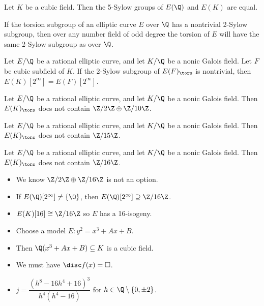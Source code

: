 \begin{frame}[plain]
\begin{prop}[Najman]
Let $K$ be a cubic field. Then the 5-Sylow groups of $E(\Q)$ and $E(K)$ are equal. 
\end{prop} \pause

\begin{prop}[Najman]
If the torsion subgroup of an elliptic curve $E$ over $\Q$ has a nontrivial 2-Sylow subgroup, then over any number field of odd degree the torsion of $E$ will have the same 2-Sylow subgroup as over $\Q$.
\end{prop} \pause

\begin{prop}
Let $E/\Q$ be a rational elliptic curve, and let $K/\Q$ be a nonic Galois field. Let $F$ be cubic subfield of $K$. If the 2-Sylow subgroup of $E(F)_\tors$ is nontrivial, then $E(K)[2^\infty]=E(F)[2^\infty]$.
\end{prop}

\end{frame}



\begin{frame}[plain]
\begin{prop}
Let $E/\Q$ be a rational elliptic curve, and let $K/\Q$ be a nonic Galois field. Then $E(K)_\tors$ does not contain $\Z/2\Z \oplus \Z/10\Z$.
\end{prop} \pause

\begin{prop}
Let $E/\Q$ be a rational elliptic curve, and let $K/\Q$ be a nonic Galois field. Then $E(K)_\tors$ does not contain $\Z/15\Z$.
\end{prop}
\end{frame}



\begin{frame}[plain]
\begin{prop}
Let $E/\Q$ be a rational elliptic curve, and let $K/\Q$ be a nonic Galois field. Then $E(K)_\tors$ does not contain $\Z/16\Z$.
\end{prop} \pause

\pf 
\begin{itemize}
\item We know $\Z/2\Z \oplus \Z/16\Z$ is not an option. \pause
\item If $E(\Q)[2^\infty] \neq \{\O\}$, then $E(\Q)[2^\infty] \supseteq \Z/16\Z$. 
\item $E(K)[16] \cong \Z/16\Z$ so $E$ has a 16-isogeny. \pause
\item Choose a model $E: y^2= x^3+Ax+B$. 
\item Then $\Q(x^3+Ax+B) \subseteq K$ is a cubic field. \pause
\item We must have $\disc f(x)= \square$. \pause
\item $j= \dfrac{(h^8-16h^4+16)^3}{h^4(h^4-16)}$ for $h \in \Q \setminus \{0,\pm2\}$.
\end{itemize}
\end{frame}



